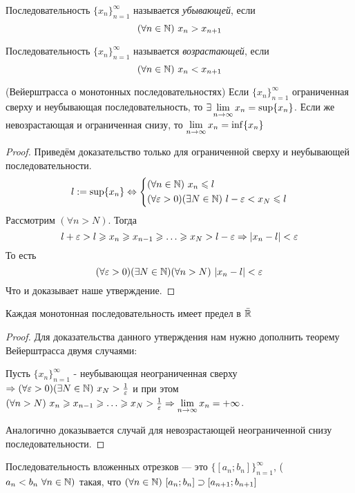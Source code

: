 \begin{definition}
	Последовательность $\{x_n\}_{n = 1}^\infty$ называется
	\textit{убывающей}, если
	\[
		(\forall n \in \mathbb{N})\ x_n > x_{n + 1}
	\]
\end{definition}

\begin{definition}
	Последовательность $\{x_n\}_{n = 1}^\infty$ называется
	\textit{возрастающей}, если
	\[
		(\forall n \in \mathbb{N})\ x_n < x_{n + 1}
	\]
\end{definition}

\begin{theorem} (Вейерштрасса о монотонных последовательностях)
	Если $\{x_n\}_{n = 1}^\infty$ ограниченная сверху и
	неубывающая последовательность, то $\exists
	\lim\limits_{n \rightarrow \infty} x_n = \sup \{x_n\}$. Если же
	невозрастающая и ограниченная снизу, то
	$\lim\limits_{n \rightarrow \infty} x_n = \inf \{x_n\}$
\end{theorem}

\begin{proof}
	Приведём доказательство только для ограниченной сверху и неубывающей последовательности.
	\[
		l := \sup \{x_n\} \Leftrightarrow \left\{\begin{aligned}
		&(\forall n \in \mathbb{N})\ x_n \leqslant l
		\\
		&(\forall \varepsilon > 0)(\exists N \in \mathbb{N})\ l - \varepsilon < x_N \leqslant l
		\end{aligned}\right.
	\]
	Рассмотрим $(\forall n > N)$. Тогда
	\[
		l + \eps > l \ge x_n \ge x_{n - 1} \ge
		\dots \ge x_N > l - \eps \Ra |x_n - l| < \eps
	\]
	То есть
	\[
		(\forall \varepsilon > 0)(\exists N \in \mathbb{N})(\forall n > N)
		\ |x_n - l| < \varepsilon
	\]
	Что и доказывает наше утверждение.
\end{proof}

\begin{proposition}
	Каждая монотонная последовательность имеет предел в $\bar{\mathbb{R}}$
\end{proposition}

\begin{proof}
	Для доказательства данного утверждения нам нужно дополнить
	теорему Вейерштрасса двумя случаями:
	
	Пусть $\{x_n\}_{n = 1}^\infty$ - неубывающая неограниченная
	сверху $\Rightarrow (\forall \varepsilon > 0)(\exists N \in \mathbb{N})\ x_N >
	\frac{1}{\varepsilon}$ и при этом $(\forall n > N)\ x_n \ge x_{n - 1}
	\ge \dots \ge x_N > \frac{1}{\eps} \Ra \liml_{n \to \infty}
	x_n = +\infty$.

	Аналогично доказывается случай для невозрастающей
	неограниченной снизу последовательности.
\end{proof}

\begin{definition}
	Последовательность вложенных отрезков --- это
	$\{[a_n; b_n]\}_{n = 1}^\infty$, ($a_n < b_n\
	\forall n \in \mathbb{N})$ такая, что $(\forall n \in \mathbb{N})
	\ [a_n; b_n] \supset [a_{n + 1}; b_{n + 1}]$
\end{definition}

